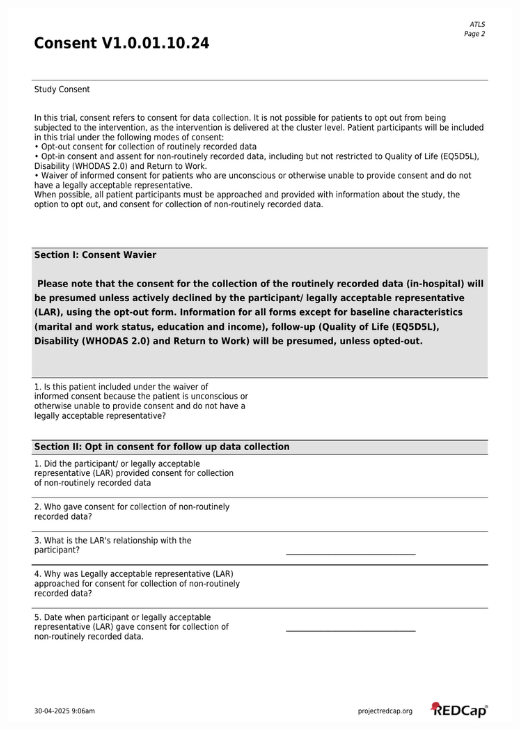 \documentclass[
]{scrartcl}
\begin{document}
\includegraphics{../case-record-form/instrument-pdfs/pages/all-instruments-2.pdf}
\end{document}
